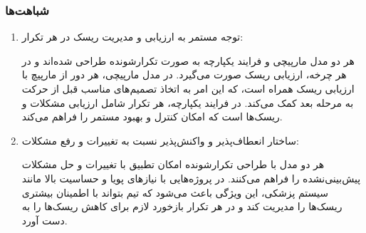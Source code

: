 \subsubsection*{شباهت‌ها}
\begin{enumerate}
\item توجه مستمر به ارزیابی و مدیریت ریسک در هر تکرار: 

هر دو مدل مارپیچی و فرایند یکپارچه به صورت تکرارشونده طراحی شده‌اند و در هر چرخه، ارزیابی ریسک صورت می‌گیرد. در مدل مارپیچی، هر دور از مارپیچ با ارزیابی ریسک همراه است، که این امر به اتخاذ تصمیم‌های مناسب قبل از حرکت به مرحله بعد کمک می‌کند​. در فرایند یکپارچه، هر تکرار شامل ارزیابی مشکلات و ریسک‌ها است که امکان کنترل و بهبود مستمر را فراهم می‌کند​.

\item ساختار انعطاف‌پذیر و واکنش‌پذیر نسبت به تغییرات و رفع مشکلات:

هر دو مدل با طراحی تکرارشونده امکان تطبیق با تغییرات و حل مشکلات پیش‌بینی‌نشده را فراهم می‌کنند. در پروژه‌هایی با نیازهای پویا و حساسیت بالا مانند سیستم پزشکی، این ویژگی باعث می‌شود که تیم بتواند با اطمینان بیشتری ریسک‌ها را مدیریت کند و در هر تکرار بازخورد لازم برای کاهش ریسک‌ها را به دست آورد.
\end{enumerate}

